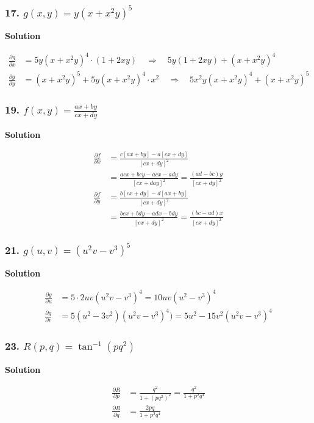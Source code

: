 \documentclass{article}
\newcommand\rr{\quad\Rightarrow\quad}
\newcommand{\solution}{\centerline{\textbf{Solution}}}
\begin{document}
\subsubsection*{17. $g(x,y) = y(x + x^2 y)^5$}
\solution
\begin{align*}
    \frac{\partial g}{\partial x} &= 5y(x+x^2y)^4\cdot (1+2xy) \rr 5y(1+2xy) + (x+x^2y)^4 \\
    \frac{\partial g}{\partial y} &= (x+x^2y)^5 + 5y(x+x^2y)^4 \cdot x^2 \rr 5x^2y(x+x^2y)^4 + (x+x^2y)^5
\end{align*}
\subsubsection*{19. $f(x,y) = \displaystyle\frac{ax + by}{cx + dy}$}
\solution
\begin{align*}
    \frac{\partial f}{\partial x} &= \displaystyle\frac{c[ax+by] - a[cx+dy]}{[cx+dy]^2} \\
                    &= \displaystyle\frac{acx+bcy-acx-ady}{[cx+day]^2} = \displaystyle\frac{(ad-bc)y}{[cx+dy]^2} \\
    \frac{\partial f}{\partial y} &= \displaystyle\frac{b[cx+dy] - d[ax+by]}{[cx+dy]^2} \\ 
                                  &= \displaystyle\frac{bcx+bdy-adx-bdy}{[cx+dy]^2} = \displaystyle\frac{(bc-ad)x}{[cx+dy]^2}
\end{align*}
\subsubsection*{21. $g(u, v) = (u^2v-v^3)^5$}
\solution
\begin{align*}
    \frac{\partial g}{\partial u} &= 5 \cdot 2uv(u^2v-v^3)^4 = 10uv(u^2-v^3)^4 \\
    \frac{\partial g}{\partial v} &= 5(u^2-3v^2)(u^2v-v^3)^4) = 5u^2-15v^2(u^2v-v^3)^4
\end{align*}
\subsubsection*{23. $R(p, q) = \tan^{-1} (pq^2)$}
\solution
\begin{align*}
    \frac{\partial R}{\partial p} &= \displaystyle\frac{q^2}{1+(pq^2)^2} = \displaystyle\frac{q^2}{1+p^2q^4} \\
    \frac{\partial R}{\partial q} &= \displaystyle\frac{2pq}{1+p^2q^4}
\end{align*}
\end{document}
